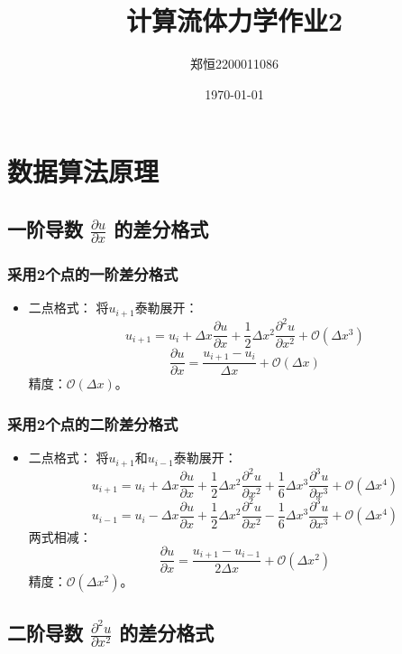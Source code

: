 \documentclass[12pt,a4paper]{article}
\title{计算流体力学作业2}
\author{郑恒2200011086}
\date{\today}
\begin{document}
\maketitle

\section{数据算法原理}
\subsection{一阶导数 $\frac{\partial u}{\partial x}$ 的差分格式}
\subsubsection{采用2个点的一阶差分格式}
\begin{itemize}
    \item 二点格式：
    将$u_{i+1}$泰勒展开：
    \[u_{i+1} = u_i + \Delta x \frac{\partial u}{\partial x} + \frac{1}{2} \Delta x^2 \frac{\partial^2 u}{\partial x^2} + \mathcal{O}(\Delta x^3)\]
    \[
    \frac{\partial u}{\partial x} = \frac{u_{i+1} - u_i}{\Delta x}+ \mathcal{O}(\Delta x)
    \]
    精度：$\mathcal{O}(\Delta x)$。
\end{itemize}
\subsubsection{采用2个点的二阶差分格式}
\begin{itemize}
    \item 二点格式：
    将$u_{i+1}$和$u_{i-1}$泰勒展开：
    \[u_{i+1} = u_i + \Delta x \frac{\partial u}{\partial x} + \frac{1}{2} \Delta x^2 \frac{\partial^2 u}{\partial x^2} +\frac{1}{6} \Delta x^3 \frac{\partial^3 u}{\partial x^3} + \mathcal{O}(\Delta x^4)\]
    \[u_{i-1} = u_i - \Delta x \frac{\partial u}{\partial x} + \frac{1}{2} \Delta x^2 \frac{\partial^2 u}{\partial x^2} -\frac{1}{6} \Delta x^3 \frac{\partial^3 u}{\partial x^3} + \mathcal{O}(\Delta x^4)\]
    两式相减：
    \[
    \frac{\partial u}{\partial x} = \frac{u_{i+1} - u_{i-1}}{2\Delta x} + \mathcal{O}(\Delta x^2)
    \]
    精度：$\mathcal{O}(\Delta x^2)$。
\end{itemize}

\subsection{二阶导数 $\frac{\partial^2 u}{\partial x^2}$ 的差分格式}
\end{document}
